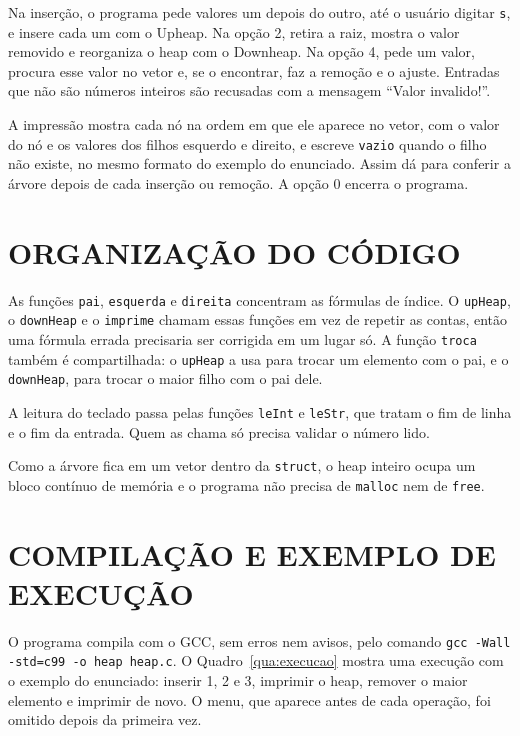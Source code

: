 \documentclass[12pt,openany,oneside,a4paper,english,brazil,sumario=tradicional]{abntex2}
\begin{document}
Na inserção, o programa pede valores um depois do outro, até o usuário digitar \texttt{s}, e insere cada um com o Upheap. Na opção 2, retira a raiz, mostra o valor removido e reorganiza o heap com o Downheap. Na opção 4, pede um valor, procura esse valor no vetor e, se o encontrar, faz a remoção e o ajuste. Entradas que não são números inteiros são recusadas com a mensagem ``Valor invalido!''.

A impressão mostra cada nó na ordem em que ele aparece no vetor, com o valor do nó e os valores dos filhos esquerdo e direito, e escreve \texttt{vazio} quando o filho não existe, no mesmo formato do exemplo do enunciado. Assim dá para conferir a árvore depois de cada inserção ou remoção. A opção 0 encerra o programa.

\section{ORGANIZAÇÃO DO CÓDIGO}

As funções \texttt{pai}, \texttt{esquerda} e \texttt{direita} concentram as fórmulas de índice. O \texttt{upHeap}, o \texttt{downHeap} e o \texttt{imprime} chamam essas funções em vez de repetir as contas, então uma fórmula errada precisaria ser corrigida em um lugar só. A função \texttt{troca} também é compartilhada: o \texttt{upHeap} a usa para trocar um elemento com o pai, e o \texttt{downHeap}, para trocar o maior filho com o pai dele.

A leitura do teclado passa pelas funções \texttt{leInt} e \texttt{leStr}, que tratam o fim de linha e o fim da entrada. Quem as chama só precisa validar o número lido.

Como a árvore fica em um vetor dentro da \texttt{struct}, o heap inteiro ocupa um bloco contínuo de memória e o programa não precisa de \texttt{malloc} nem de \texttt{free}.

\section{COMPILAÇÃO E EXEMPLO DE EXECUÇÃO}

O programa compila com o GCC, sem erros nem avisos, pelo comando \texttt{gcc -Wall -std=c99 -o heap heap.c}. O Quadro~\ref{qua:execucao} mostra uma execução com o exemplo do enunciado: inserir 1, 2 e 3, imprimir o heap, remover o maior elemento e imprimir de novo. O menu, que aparece antes de cada operação, foi omitido depois da primeira vez.
\end{document}
